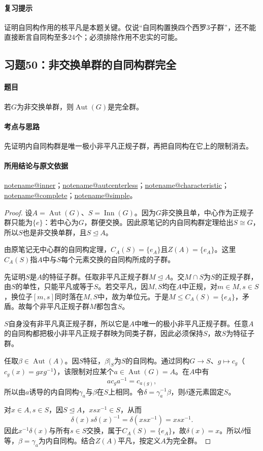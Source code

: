 \documentclass[UTF8,a4paper,11pt,fontset=windows]{ctexart}
\makeatletter
\DeclareMathOperator{\Aut}{Aut}\DeclareMathOperator{\Inn}{Inn}
\newcommand{\noteref}[1]{\hyperref[note:#1]{\csname notename@#1\endcsname}}
\newcommand{\exref}[2]{\hyperref[ex:#1:#2]{第#1章习题#2}}
\makeatother
\begin{document}
\paragraph{复习提示}
证明自同构作用的核平凡是本题关键。仅说“自同构置换四个西罗3子群”，还不能直接断言自同构至多24个；必须排除作用不忠实的可能。


\subsection{习题50：\texorpdfstring{非交换单群的自同构群完全}{非交换单群的自同构群完全}}
\label{ex:2:50}

\paragraph{题目}
若$G$为非交换单群，则$\Aut(G)$是完全群。

\paragraph{考点与思路}
先证明内自同构群是唯一极小非平凡正规子群，再把自同构在它上的限制消去。

\paragraph{所用结论与原文依据}
\noteref{inner}；\noteref{autcenterless}；\noteref{characteristic}；\noteref{complete}；\noteref{simple}。


\begin{proof}
设$A=\Aut(G)$、$S=\Inn(G)$。因为$G$非交换且单，中心作为正规子群只能为$\{e\}$：若中心为$G$，群便交换。因此原笔记的内自同构群定理给出$S\cong G$，所以$S$也是非交换单群，且$S\trianglelefteq A$。

由原笔记无中心群的自同构定理，$C_A(S)=\{e_A\}$且$Z(A)=\{e_A\}$。这里$C_A(S)$指$A$中与$S$每个元素交换的自同构所成的子群。

先证明$S$是$A$的特征子群。任取非平凡正规子群$M\trianglelefteq A$。交$M\cap S$为$S$的正规子群，由$S$的单性，只能平凡或等于$S$。若交平凡，因$M,S$均在$A$中正规，对$m\in M,s\in S$，换位子$[m,s]$同时落在$M,S$中，故为单位元。于是$M\leq C_A(S)=\{e_A\}$，矛盾。故每个非平凡正规子群$M$都包含$S$。

$S$自身没有非平凡真正规子群，所以它是$A$中唯一的极小非平凡正规子群。任意$A$的自同构都把极小非平凡正规子群映为同类子群，因此必须保持$S$，故$S$为特征子群。

任取$\beta\in\Aut(A)$。因$S$特征，$\beta|_S$为$S$的自同构。通过同构$G\to S$、$g\mapsto c_g$（$c_g(x)=gxg^{-1}$），该限制对应某个$a\in\Aut(G)=A$。在$A$中有
\[
ac_ga^{-1}=c_{a(g)},
\]
所以由$a$诱导的内自同构$\gamma_a$与$\beta$在$S$上相同。令$\delta=\gamma_a^{-1}\beta$，则$\delta$逐元素固定$S$。

对$x\in A,s\in S$，因$S\trianglelefteq A$，$xsx^{-1}\in S$，从而
\[
\delta(x)s\delta(x)^{-1}=\delta(xsx^{-1})=xsx^{-1}.
\]
因此$x^{-1}\delta(x)$与所有$s\in S$交换，属于$C_A(S)=\{e_A\}$，故$\delta(x)=x$。所以$\delta$恒等，$\beta=\gamma_a$为内自同构。结合$Z(A)$平凡，按定义$A$为完全群。
\end{proof}
\end{document}
